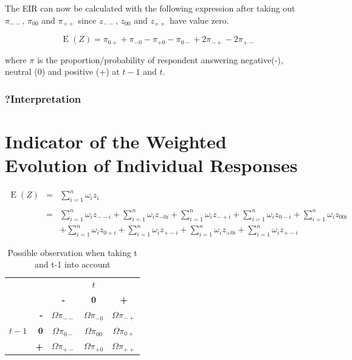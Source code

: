 \documentclass[12pt,a4paper,oneside]{book}
\DeclareMathOperator{\E}{E}
\begin{document}
The EIR can now be calculated with the following expression after taking out $\pi_{--}$, $\pi_{00}$ and $\pi_{++}$ since $z_{--}$, $z_{00}$ and $z_{++}$ have value zero.

\begin{equation}
    \E(Z) = \pi_{0+} + \pi_{-0} - \pi_{+0} - \pi_{0-} +2\pi_{-+} -2\pi_{+-} 
\end{equation}

where $\pi$ is the proportion/probability of respondent answering negative(-), neutral (0) and positive (+) at $t-1$ and $t$. 


\subsubsection{?Interpretation}


\section{Indicator of the Weighted Evolution of Individual Responses}

\begin{eqnarray}
    \E(Z) &=&  \sum_{i=1}^n \omega_i z_i \\ \nonumber \\
        &=& \sum_{i=1}^n \omega_i z_{--i} 
     + \sum_{i=1}^n \omega_i z_{-0i}  
    + \sum_{i=1}^n \omega_i z_{-+i} 
    + \sum_{i=1}^n \omega_i z_{0-i}  
    + \sum_{i=1}^n \omega_i z_{00i}   \nonumber  \\
    &&  + \sum_{i=1}^n \omega_i z_{0+i} 
    + \sum_{i=1}^n \omega_i z_{+-i} 
    + \sum_{i=1}^n \omega_i z_{+0i} 
    + \sum_{i=1}^n \omega_i z_{+-i} 
\end{eqnarray}



\begin{table}[H]
    \centering
    \begin{tabular}{r | r | c c c | }
    \multicolumn{1}{r}{} & \multicolumn{1}{r}{} &	\multicolumn{3}{c}{$t$} \\ \cline{3-5}
    \multicolumn{1}{r}{} & 		& \textbf{-} & \textbf{0} & \textbf{+} \\ \cline{2-5}
    		&    \textbf{-} & $\Omega \pi_{--}$	& $\Omega \pi_{-0}$	& $\Omega \pi_{-+}$ \\ 
    $t-1$ & \textbf{0} & $\Omega \pi_{0-}$	& $\Omega \pi_{00}$	& $\Omega \pi_{0+}$	\\
    		&    \textbf{+} & $\Omega \pi_{+-}$	& $\Omega \pi_{+0}$	& $\Omega \pi_{++}$ \\ \cline{2-5}
    \end{tabular}    
    \caption{Possible observation when taking t and t-1 into account}
    \label{tab:EIR proportions}
\end{table}
\end{document}
